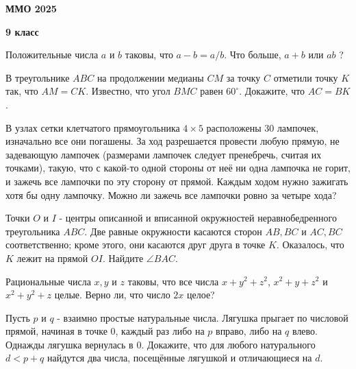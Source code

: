 \centerline{\bf \Huge ММО 2025}
\centerline{\bf \Huge 9 класс}

\begin{flushright}
        \scriptsize{}
\end{flushright}

Положительные числа $a$ и $b$ таковы, что $a-b=a / b$. Что больше, $a+b$ или $a b$ ?

В треугольнике $A B C$ на продолжении медианы $C M$ за точку $C$ отметили точку $K$ так, что $A M=C K$. Известно, что угол $B M C$ равен $60^{\circ}$. Докажите, что $A C=B K$.

В узлах сетки клетчатого прямоугольника $4 \times 5$ расположены 30 лампочек, изначально все они погашены. За ход разрешается провести любую прямую, не задевающую лампочек (размерами лампочек следует пренебречь, считая их точками), такую, что с какой-то одной стороны от неё ни одна лампочка не горит, и зажечь все лампочки по эту сторону от прямой. Каждым ходом нужно зажигать хотя бы одну лампочку. Можно ли зажечь все лампочки ровно за четыре хода?

Точки $O$ и $I$ - центры описанной и вписанной окружностей неравнобедренного треугольника $A B C$. Две равные окружности касаются сторон $A B, B C$ и $A C, B C$ соответственно; кроме этого, они касаются друг друга в точке $K$. Оказалось, что $K$ лежит на прямой $O I$. Найдите $\angle B A C$.

Рациональные числа $x, y$ и $z$ таковы, что все числа $x+y^2+z^2$, $x^2+y+z^2$ и $x^2+y^2+z$ целые. Верно ли, что число $2 x$ целое?

Пусть $p$ и $q$ - взаимно простые натуральные числа. Лягушка прыгает по числовой прямой, начиная в точке $0$, каждый раз либо на $p$ вправо, либо на $q$ влево. Однажды лягушка вернулась в $0$. Докажите, что для любого натурального $d<p+q$ найдутся два числа, посещённые лягушкой и отличающиеся на $d$.